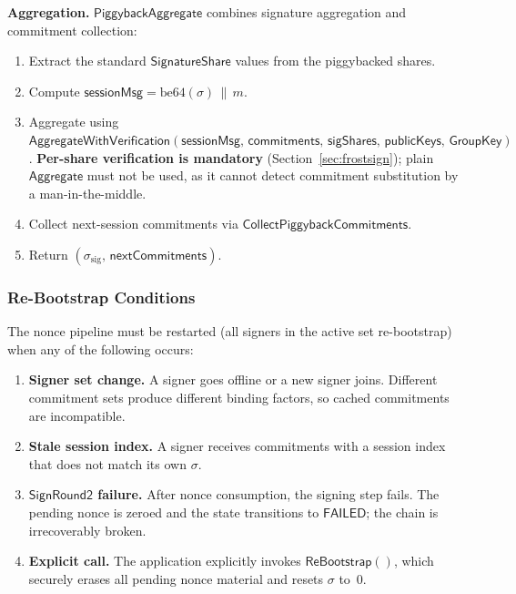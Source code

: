 \documentclass[11pt,a4paper]{article}
\begin{document}
\medskip\noindent
\textbf{Aggregation.}
$\mathsf{PiggybackAggregate}$ combines signature aggregation and commitment
collection:
\begin{enumerate}[nosep]
  \item Extract the standard $\mathsf{SignatureShare}$ values from the
    piggybacked shares.
  \item Compute $\mathsf{sessionMsg} = \mathrm{be64}(\sigma) \,\|\, m$.
  \item Aggregate using
    $\mathsf{AggregateWithVerification}(\mathsf{sessionMsg},\,
    \mathsf{commitments},\, \mathsf{sigShares},\, \mathsf{publicKeys},\,
    \mathsf{GroupKey})$.
    \textbf{Per-share verification is mandatory}
    (Section~\ref{sec:frostsign}); plain $\mathsf{Aggregate}$ must not be used,
    as it cannot detect commitment substitution by a man-in-the-middle.
  \item Collect next-session commitments via $\mathsf{CollectPiggybackCommitments}$.
  \item Return $(\sigma_{\mathrm{sig}},\, \mathsf{nextCommitments})$.
\end{enumerate}

\subsubsection{Re-Bootstrap Conditions}
\label{sec:piggyback-rebootstrap}

The nonce pipeline must be restarted (all signers in the active set
re-bootstrap) when any of the following occurs:
\begin{enumerate}[nosep]
  \item \textbf{Signer set change.} A signer goes offline or a new signer
    joins.  Different commitment sets produce different binding factors, so
    cached commitments are incompatible.
  \item \textbf{Stale session index.} A signer receives commitments with a
    session index that does not match its own $\sigma$.
  \item \textbf{$\mathsf{SignRound2}$ failure.} After nonce consumption, the
    signing step fails.  The pending nonce is zeroed and the state transitions
    to $\mathsf{FAILED}$; the chain is irrecoverably broken.
  \item \textbf{Explicit call.} The application explicitly invokes
    $\mathsf{ReBootstrap}()$, which securely erases all pending nonce material
    and resets $\sigma$ to~0.
\end{enumerate}
\end{document}
